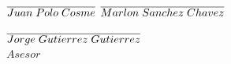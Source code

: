 \documentclass[a4paper, 12pt]{article}
\begin{document}
\newpage


\newpage

\vskip 5cm
\hspace{1.5cm}$\overline{Juan\hspace{.1cm} Polo\hspace{.1cm}Cosme}$ 
 \hspace{4.5cm} $\overline{Marlon\hspace{.1cm} Sanchez \hspace{.1cm}Chavez}$\\


\vskip 2cm
\begin{center}
$\overline{Jorge \hspace{.1cm} Gutierrez\hspace{.1cm}Gutierrez}$\\ $Asesor$
\end{center}
\end{document}
